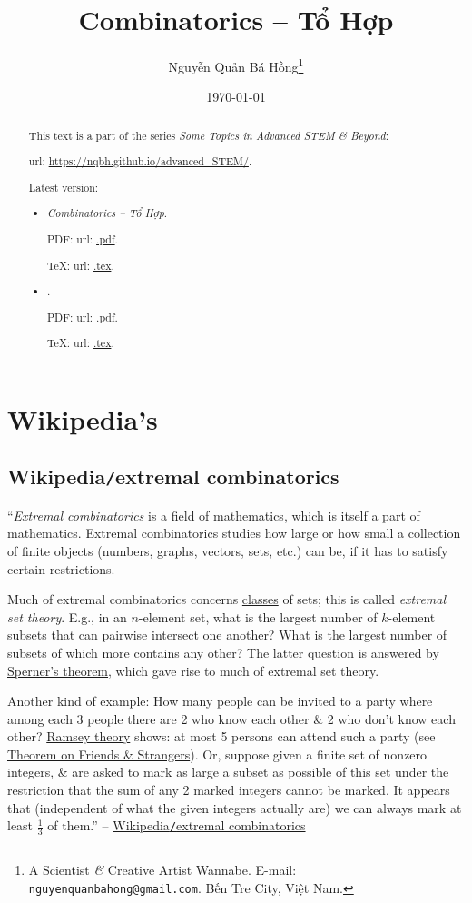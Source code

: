 \documentclass{article}
\title{Combinatorics -- Tổ Hợp}
\author{Nguyễn Quản Bá Hồng\footnote{A Scientist {\it\&} Creative Artist Wannabe. E-mail: {\tt nguyenquanbahong@gmail.com}. Bến Tre City, Việt Nam.}}
\date{\today}
\begin{document}
\maketitle
\begin{abstract}
	This text is a part of the series {\it Some Topics in Advanced STEM \& Beyond}:
	
	{\sc url}: \url{https://nqbh.github.io/advanced_STEM/}.
	
	Latest version:
	\begin{itemize}
		\item {\it Combinatorics -- Tổ Hợp}.
		
		PDF: {\sc url}: \url{.pdf}.
		
		\TeX: {\sc url}: \url{.tex}.
		\item {\it }.
		
		PDF: {\sc url}: \url{.pdf}.
		
		\TeX: {\sc url}: \url{.tex}.
	\end{itemize}
\end{abstract}
\tableofcontents


\section{Wikipedia's}

\subsection{Wikipedia{\tt/}extremal combinatorics}
``{\it Extremal combinatorics} is a field of mathematics, which is itself a part of mathematics. Extremal combinatorics studies how large or how small a collection of finite objects (numbers, graphs, vectors, sets, etc.) can be, if it has to satisfy certain restrictions.

Much of extremal combinatorics concerns \href{https://en.wikipedia.org/wiki/Class_(set_theory)}{classes} of sets; this is called {\it extremal set theory}. E.g., in an $n$-element set, what is the largest number of $k$-element subsets that can pairwise intersect one another? What is the largest number of subsets of which more contains any other? The latter question is answered by \href{https://en.wikipedia.org/wiki/Sperner%27s_theorem}{Sperner's theorem}, which gave rise to much of extremal set theory.

Another kind of example: How many people can be invited to a party where among each 3 people there are 2 who know each other \& 2 who don't know each other? \href{https://en.wikipedia.org/wiki/Ramsey_theory}{Ramsey theory} shows: at most 5 persons can attend such a party (see \href{https://en.wikipedia.org/wiki/Theorem_on_Friends_and_Strangers}{Theorem on Friends \& Strangers}). Or, suppose given a finite set of nonzero integers, \& are asked to mark as large a subset as possible of this set under the restriction that the sum of any 2 marked integers cannot be marked. It appears that (independent of what the given integers actually are) we can always mark at least $\frac{1}{3}$ of them.'' -- \href{https://en.wikipedia.org/wiki/Extremal_combinatorics}{Wikipedia{\tt/}extremal combinatorics}
\end{document}
